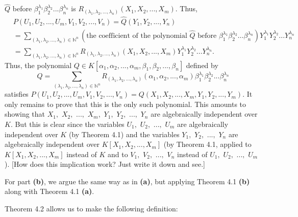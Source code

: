 \documentclass[12pt,final,notitlepage,onecolumn,german]{article}%
\begin{document}
$\widehat{Q}$ before $\beta_{1}^{\lambda_{1}}\beta_{2}^{\lambda_{2}}%
...\beta_{n}^{\lambda_{n}}$ is $R_{\left(  \lambda_{1},\lambda_{2}%
,...,\lambda_{n}\right)  }\left(  X_{1},X_{2},...,X_{m}\right)  $. Thus,%
\begin{align*}
&  P\left(  U_{1},U_{2},...,U_{m},V_{1},V_{2},...,V_{n}\right)  =\widehat
{Q}\left(  Y_{1},Y_{2},...,Y_{n}\right) \\
&  =\sum_{\left(  \lambda_{1},\lambda_{2},...,\lambda_{n}\right)
\in\mathbb{N}^{n}}\left(  \text{the coefficient of the polynomial }\widehat
{Q}\text{ before }\beta_{1}^{\lambda_{1}}\beta_{2}^{\lambda_{2}}...\beta
_{n}^{\lambda_{n}}\right)  Y_{1}^{\lambda_{1}}Y_{2}^{\lambda_{2}}%
...Y_{n}^{\lambda_{n}}\\
&  =\sum_{\left(  \lambda_{1},\lambda_{2},...,\lambda_{n}\right)
\in\mathbb{N}^{n}}R_{\left(  \lambda_{1},\lambda_{2},...,\lambda_{n}\right)
}\left(  X_{1},X_{2},...,X_{m}\right)  Y_{1}^{\lambda_{1}}Y_{2}^{\lambda_{2}%
}...Y_{n}^{\lambda_{n}}.
\end{align*}
Thus, the polynomial $Q\in K\left[  \alpha_{1},\alpha_{2},...,\alpha_{m}%
,\beta_{1},\beta_{2},...,\beta_{n}\right]  $ defined by%
\[
Q=\sum_{\left(  \lambda_{1},\lambda_{2},...,\lambda_{n}\right)  \in
\mathbb{N}^{n}}R_{\left(  \lambda_{1},\lambda_{2},...,\lambda_{n}\right)
}\left(  \alpha_{1},\alpha_{2},...,\alpha_{m}\right)  \beta_{1}^{\lambda_{1}%
}\beta_{2}^{\lambda_{2}}...\beta_{n}^{\lambda_{n}}%
\]
satisfies $P\left(  U_{1},U_{2},...,U_{m},V_{1},V_{2},...,V_{n}\right)
=Q\left(  X_{1},X_{2},...,X_{m},Y_{1},Y_{2},...,Y_{m}\right)  $. It only
remains to prove that this is the only such polynomial. This amounts to
showing that $X_{1},$ $X_{2},$ $...,$ $X_{m},$ $Y_{1},$ $Y_{2},$ $...,$
$Y_{n}$ are algebraically independent over $K$. But this is clear since the
variables $U_{1},$ $U_{2},$ $...,$ $U_{m}$ are algebraically independent over
$K$ (by Theorem 4.1) and the variables $Y_{1},$ $Y_{2},$ $...,$ $Y_{n}$ are
algebraically independent over $K\left[  X_{1},X_{2},...,X_{m}\right]  $ (by
Theorem 4.1, applied to $K\left[  X_{1},X_{2},...,X_{m}\right]  $ instead of
$K$ and to $V_{1},$ $V_{2},$ $...,$ $V_{n}$ instead of $U_{1},$ $U_{2},$
$...,$ $U_{m}$). [How does this implication work? Just write it down and see.]

For part \textbf{(b)}, we argue the same way as in \textbf{(a)}, but applying
Theorem 4.1 \textbf{(b)} along with Theorem 4.1 \textbf{(a)}.

Theorem 4.2 allows us to make the following definition:
\end{document}
